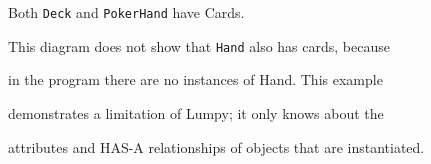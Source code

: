 Both {\tt Deck} and {\tt PokerHand} have Cards.






This diagram does not show that {\tt Hand} also has cards, because

in the program there are no instances of Hand.  This example

demonstrates a limitation of Lumpy; it only knows about the

attributes and HAS-A relationships of objects that are instantiated.



\printindex



\clearemptydoublepage










